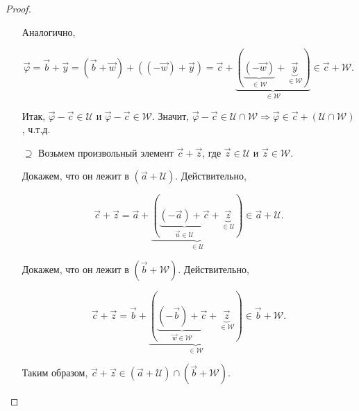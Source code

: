 \begin{proof}
\begin{enumerate}
        Аналогично,
    
        $$\vec{\varphi} = \vec{b} + \vec{y} = (\vec{b} + \vec{w}) + ((-\vec{w}) + \vec{y}) = \vec{c} + \underbrace{(\underbrace{(-\vec{w})}_{\in \mathcal{W}} + \underbrace{\vec{y}}_{\in \mathcal{W}})}_{\in \mathcal{W}} \in \vec{c} +\mathcal{W}.$$
    
        Итак, $\vec{\varphi} - \vec{c} \in \mathcal{U}$ и $\vec{\varphi} - \vec{c} \in \mathcal{W}$. Значит, $\vec{\varphi} - \vec{c} \in \mathcal{U} \cap \mathcal{W} \Rightarrow \vec{\varphi} \in \vec{c} + (\mathcal{U} \cap \mathcal{W})$, ч.т.д.
        
        \item[$\supseteq$] Возьмем произвольный элемент $\vec{c} + \vec{z}$, где $\vec{z} \in \mathcal{U}$ и $\vec{z} \in \mathcal{W}$.

        Докажем, что он лежит в $(\vec{a} + \mathcal{U})$. Действительно, 
    
        $$\vec{c} + \vec{z} = \vec{a} + \underbrace{(\underbrace{(-\vec{a}) + \vec{c}}_{\vec{u} \in \mathcal{U}} + \underbrace{\vec{z}}_{\in \mathcal{U}})}_{\in \mathcal{U}} \in \vec{a} + \mathcal{U.}$$
    
        Докажем, что он лежит в $(\vec{b} + \mathcal{W})$. Действительно, 
    
        $$\vec{c} + \vec{z} = \vec{b} + \underbrace{(\underbrace{(-\vec{b}) + \vec{c}}_{\vec{w} \in \mathcal{W}} + \underbrace{\vec{z}}_{\in \mathcal{W}})}_{\in \mathcal{W}} \in \vec{b} + \mathcal{W.}$$
    
        Таким образом, $\vec{c} + \vec{z} \in (\vec{a} + \mathcal{U}) \cap (\vec{b} + \mathcal{W})$.
    \end{enumerate}
\end{proof}
